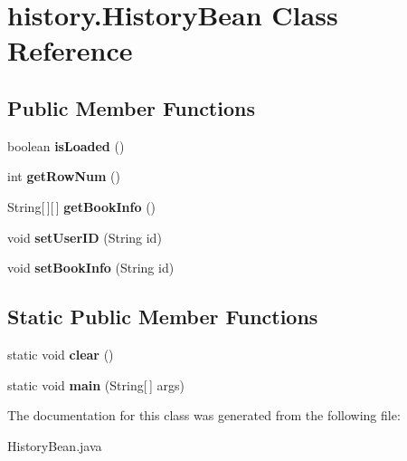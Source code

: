 \hypertarget{classhistory_1_1_history_bean}{}\section{history.\+History\+Bean Class Reference}
\label{classhistory_1_1_history_bean}
\subsection*{Public Member Functions}
\begin{DoxyCompactItemize}
\item 
boolean {\bfseries is\+Loaded} ()\hypertarget{classhistory_1_1_history_bean_ad8f46a0ae1fb61150f32009ce9883693}{}\label{classhistory_1_1_history_bean_ad8f46a0ae1fb61150f32009ce9883693}

\item 
int {\bfseries get\+Row\+Num} ()\hypertarget{classhistory_1_1_history_bean_a9d05f9cc6dad82412af5888c9e694a12}{}\label{classhistory_1_1_history_bean_a9d05f9cc6dad82412af5888c9e694a12}

\item 
String\mbox{[}$\,$\mbox{]}\mbox{[}$\,$\mbox{]} {\bfseries get\+Book\+Info} ()\hypertarget{classhistory_1_1_history_bean_ae66608c4f577b70115f257f75551098f}{}\label{classhistory_1_1_history_bean_ae66608c4f577b70115f257f75551098f}

\item 
void {\bfseries set\+User\+ID} (String id)\hypertarget{classhistory_1_1_history_bean_aa599d648e48b45d460b0e64e84c6bb3a}{}\label{classhistory_1_1_history_bean_aa599d648e48b45d460b0e64e84c6bb3a}

\item 
void {\bfseries set\+Book\+Info} (String id)\hypertarget{classhistory_1_1_history_bean_a8c40038ea495990a54d7f3bcfae304d7}{}\label{classhistory_1_1_history_bean_a8c40038ea495990a54d7f3bcfae304d7}

\end{DoxyCompactItemize}
\subsection*{Static Public Member Functions}
\begin{DoxyCompactItemize}
\item 
static void {\bfseries clear} ()\hypertarget{classhistory_1_1_history_bean_a4028b20aae7962ee093b38c5b3e4517a}{}\label{classhistory_1_1_history_bean_a4028b20aae7962ee093b38c5b3e4517a}

\item 
static void {\bfseries main} (String\mbox{[}$\,$\mbox{]} args)\hypertarget{classhistory_1_1_history_bean_ac709fce9384d1ee0e1352383e5531f4d}{}\label{classhistory_1_1_history_bean_ac709fce9384d1ee0e1352383e5531f4d}

\end{DoxyCompactItemize}


The documentation for this class was generated from the following file\+:\begin{DoxyCompactItemize}
\item 
History\+Bean.\+java\end{DoxyCompactItemize}
